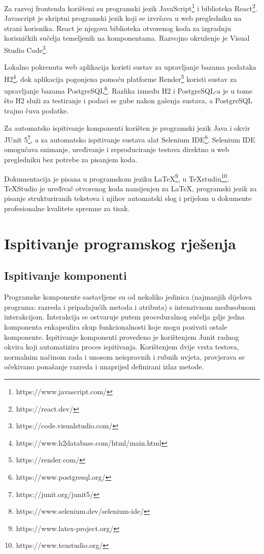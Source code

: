 			Za razvoj frontenda korišteni su programski jezik JavaScript\footnote{https://www.javascript.com/} i biblioteka React\footnote{https://react.dev/}. Javascript je skriptni programski jezik koji se izvršava u web pregledniku na strani korisnika. React je njegova biblioteka otvorenog koda za izgradnju korisničkih sučelja temeljenih na komponentama. Razvojno okruženje je Visual Studio Code\footnote{https://code.visualstudio.com/}. 
			
			Lokalno pokrenuta web aplikacija koristi sustav za upravljanje bazama podataka H2\footnote{https://www.h2database.com/html/main.html}, dok aplikacija pogonjena pomoću platforme Render\footnote{https://render.com/} koristi sustav za upravljanje bazama PostgreSQL\footnote{https://www.postgresql.org/}. Razlika između H2 i PostgreSQL-a je u tome što H2 služi za testiranje i podaci se gube nakon gašenja sustava, a PostgreSQL trajno čuva podatke. 
			
			Za automatsko ispitivanje komponenti korišten je programski jezik Java i okvir JUnit 5\footnote{https://junit.org/junit5/}, a za automatsko ispitivanje sustava alat Selenium IDE\footnote{https://www.selenium.dev/selenium-ide/}. Selenium IDE omogućava snimanje, uređivanje i reproduciranje testova direktno u web pregledniku bez potrebe za pisanjem koda.
			
			Dokumentacija je pisana u programskom jeziku LaTeX\footnote{https://www.latex-project.org/}, u TeXstudiu\footnote{https://www.texstudio.org/}. TeXStudio je uređivač otvorenog koda namijenjen za LaTeX, programski jezik za pisanje strukturiranih tekstova i njihov automatski slog i prijelom u dokumente profesionalne kvalitete spremne za tisak.
						 
			
			\eject 
		
	
		\section{Ispitivanje programskog rješenja}
	
			
			\subsection{Ispitivanje komponenti}
			Programske komponente sastavljene su od nekoliko jedinica (najmanjih dijelova programa: razreda i pripadajućih metoda i atributa) s intenzivnom međusobnom interakcijom. Interakcija se ostvaruje putem proceduralnog sučelja gdje jedna komponenta enkapsulira skup funkcionalnosti koje mogu pozivati ostale komponente. Ispitivanje komponenti provedeno je  korištenjem Junit radnog okvira koji automatizira proces ispitivanja. Korištenjem dvije vrsta testova, normalnim načinom rada i unosom neispravnih i rubnih uvjeta, provjerava se očekivano ponašanje razreda i unaprijed definirani izlaz metode.
			
